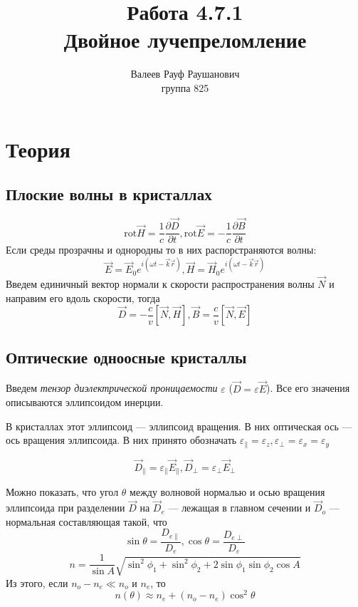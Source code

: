 \documentclass[a4paper, 12pt]{article}%
\author{Валеев Рауф Раушанович \\
группа 825}
\title{\textbf{Работа 4.7.1\\Двойное лучепреломление}}
\date{}
\begin{document}
\maketitle
\newpage
\section*{Теория}
\subsection*{Плоские волны в кристаллах}
\begin{equation}
\text{rot} \vec{H} = \dfrac{1}{c}\dfrac{\partial \vec{D}}{\partial t}, \text{rot} \vec{E} = -\dfrac{1}{c}\dfrac{\partial \vec{B}}{\partial t}
\end{equation}
Если среды прозрачны и однородны то в них распорстраняются волны:
\begin{equation}
\vec E = \vec{E}_0 e^{i(\omega t - \vec{k}\vec{r})}, \vec{H} = \vec{H}_0e^{i(\omega t - \vec{k}\vec{r})}
\end{equation}
Введем единичный вектор нормали к скорости распространения волны $\vec{N}$ и направим его вдоль скорости, тогда
\begin{equation}
\vec{D} = -\dfrac{c}{v}\left[\vec{N}, \vec{H}\right], \vec{B} = \dfrac{c}{v}\left[	\vec{N}, \vec{E}\right]
\end{equation}
\subsection*{Оптические одноосные кристаллы}
Введем \textit{тензор диэлектрической проницаемости} $\varepsilon$ ($\vec{D} = \varepsilon \vec{E}$). Все его значения описываются эллипсоидом инерции. 

В кристаллах этот эллипсоид --- эллипсоид вращения. В них оптическая ось --- ось вращения эллипсоида. В них принято обозначать $\varepsilon_{\parallel} = \varepsilon_z, \varepsilon_{\perp} = \varepsilon_x = \varepsilon_y$

\begin{equation}
\vec{D}_{\parallel} = \varepsilon_{\parallel} \vec{E}_{\parallel},\vec{D}_{\perp} = \varepsilon_{\perp} \vec{E}_{\perp} 
\end{equation}

Можно показать, что угол $\theta$ между волновой нормалью и осью вращения эллипсоида при разделении $\vec{D}$ на $\vec{D}_e$ --- лежащая в главном сечении и $\vec{D}_o$ --- нормальная составляющая такой, что
\begin{equation}
\sin \theta = \dfrac{D_{e\parallel}}{D_e}, \cos \theta = \dfrac{D_{e\perp}}{D_e}
\end{equation}
\begin{equation}
n = \dfrac{1}{\sin A}\sqrt{\sin^2 \phi_1 + \sin^2 \phi_2 + 2 \sin \phi_1 \sin \phi_2 \cos A}
\end{equation}
Из этого, если $n_o - n_e \ll n_o$ и $n_e$, то 
\begin{equation}
n(\theta) \approx n_e + (n_o - n_e) \cos^2 \theta
\end{equation}
\end{document}
